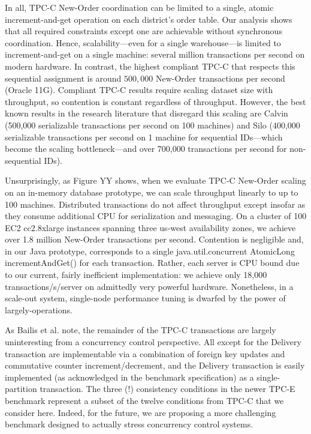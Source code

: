 In all, TPC-C New-Order coordination can be limited to a single,
atomic increment-and-get operation on each district's order table. Our
\cfreedom analysis shows that all required constraints except one are
achievable without synchronous coordination. Hence, scalability---even
for a single warehouse---is limited to increment-and-get on a single
machine: several million transactions per second on modern
hardware. In contrast, the highest compliant TPC-C that respects this
sequential assignment is around $500,000$ New-Order transactions per
second (Oracle 11G). Compliant TPC-C results require scaling dataset
size with throughput, so contention is constant regardless of
throughput. However, the best known results in the research literature
that disregard this scaling are Calvin (500,000 serializable
transactions per second on 100 machines) and Silo (400,000
serializable transactions per second on 1 machine for sequential
IDs---which become the scaling bottleneck---and over 700,000
transactions per second for non-sequential IDs).

Unsurprisingly, as Figure YY shows, when we evaluate TPC-C New-Order
scaling on an in-memory database prototype, we can scale throughput
linearly to up to 100 machines. Distributed transactions do not affect
throughput except insofar as they consume additional CPU for
serialization and messaging. On a cluster of 100 EC2 cc2.8xlarge
instances spanning three us-west availability zones, we achieve over
1.8 million New-Order transactions per second. Contention is
negligible and, in our Java prototype, corresponds to a single
java.util.concurrent AtomicLong incrementAndGet() for each
transaction. Rather, each server is CPU bound due to our current,
fairly inefficient implementation: we achieve only 18,000
transactions/s/server on admittedly very powerful
hardware. Nonetheless, in a scale-out system, single-node performance
tuning is dwarfed by the power of largely-\cfree operations.

As Bailis et al. note, the remainder of the TPC-C transactions are
largely uninteresting from a concurrency control perspective. All
except for the Delivery transaction are implementable via a
combination of foreign key updates and commutative counter
increment/decrement, and the Delivery transaction is easily
implemented (as acknowledged in the benchmark specification) as a
single-partition transaction. The three (!)  consistency conditions in
the newer TPC-E benchmark represent a subset of the twelve conditions
from TPC-C that we consider here. Indeed, for the future, we are
proposing a more challenging benchmark designed to actually stress
concurrency control systems.
